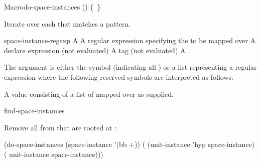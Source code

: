 \documentclass[10pt,twoside,english,pdftex]{article}
\begin{document}
\begin{functiondoc}{Macro}{do-space-instances}%
  {()
    \mbox{\{ \vbar{} \}\superstar}}

\fnsyntax

\fnpurpose Iterate over each  that matches a
 pattern.

\fnpackage {}

\fnmodule {}

\fnargs
\begin{args}{space-instance-regexp}
\arg[var] A 
 A  regular expression
specifying the  to be mapped over
\arg[declaration] A declare expression (not evaluated)
\arg[tag] A  tag (not evaluated)
\arg[form] A 
\end{args}

\fndescription 
The  argument is either the symbol
 (indicating all ) or a list
representing a regular expression where the following reserved symbols
are interpreted as follows:
\spaceinstanceregexp

A  value consisting of a list of
 mapped over as supplied.

\begin{alsos}{find-space-instances}
\end{alsos}

\fnexample 
{}%
%
Remove all   from
 that are rooted at :
%
\W\supp
\begin{example}
  (do-space-instances (space-instance '(bb +))
    ( (unit-instance 'hyp space-instance)
      ( unit-instance space-instance)))
\end{example}

\end{functiondoc}

\end{document}
